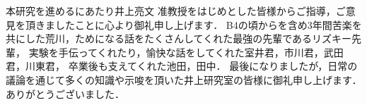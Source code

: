 \theacknowledgments
本研究を進めるにあたり井上亮文 准教授をはじめとした皆様からご指導，ご意見を頂きましたことに心より御礼申し上げます．
B4の頃からを含め3年間苦楽を共にした荒川，ためになる話をたくさんしてくれた最強の先輩であるリズキー先輩，
実験を手伝ってくれたり，愉快な話をしてくれた室井君，市川君，武田君，川東君，
卒業後も支えてくれた池田，田中．
最後になりましたが，日常の議論を通じて多くの知識や示唆を頂いた井上研究室の皆様に御礼申し上げます．ありがとうございました．